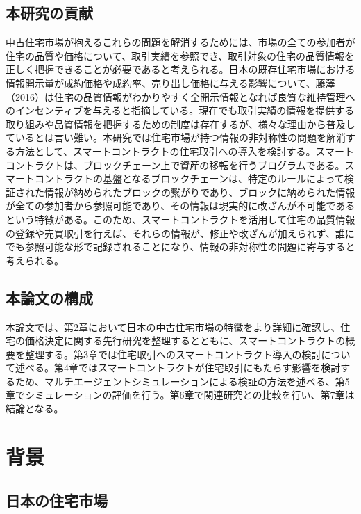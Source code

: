 \documentclass[a4paper,fontsize=11pt,report,notitlepage,line_length=38zw,number_of_lines=40,dvipdfmx]{jlreq}
\begin{document}
\section{本研究の貢献}
中古住宅市場が抱えるこれらの問題を解消するためには、市場の全ての参加者が住宅の品質や価格について、取引実績を参照でき、取引対象の住宅の品質情報を正しく把握できることが必要であると考えられる。日本の既存住宅市場における情報開示量が成約価格や成約率、売り出し価格に与える影響について、藤澤（2016）\cite{fujisawa2016}は住宅の品質情報がわかりやすく全開示情報となれば良質な維持管理へのインセンティブを与えると指摘している。現在でも取引実績の情報を提供する取り組みや品質情報を把握するための制度は存在するが、様々な理由から普及しているとは言い難い。本研究では住宅市場が持つ情報の非対称性の問題を解消する方法として、スマートコントラクトの住宅取引への導入を検討する。スマートコントラクトは、ブロックチェーン上で資産の移転を行うプログラムである。スマートコントラクトの基盤となるブロックチェーンは、特定のルールによって検証された情報が納められたブロックの繋がりであり、ブロックに納められた情報が全ての参加者から参照可能であり、その情報は現実的に改ざんが不可能であるという特徴がある。このため、スマートコントラクトを活用して住宅の品質情報の登録や売買取引を行えば、それらの情報が、修正や改ざんが加えられず、誰にでも参照可能な形で記録されることになり、情報の非対称性の問題に寄与すると考えられる。

\section{本論文の構成}
本論文では、第2章において日本の中古住宅市場の特徴をより詳細に確認し、住宅の価格決定に関する先行研究を整理するとともに、スマートコントラクトの概要を整理する。第3章では住宅取引へのスマートコントラクト導入の検討について述べる。第4章ではスマートコントラクトが住宅取引にもたらす影響を検討するため、マルチエージェントシミュレーションによる検証の方法を述べる、第5章でシミュレーションの評価を行う。第6章で関連研究との比較を行い、第7章は結論となる。


\chapter{背景}
\section{日本の住宅市場}
\end{document}

